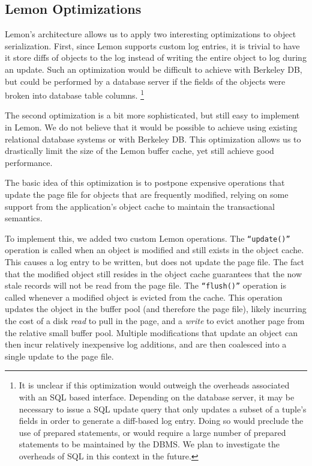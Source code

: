 \documentclass[letterpaper,twocolumn,english]{article}
\newcommand{\yad}{Lemon\xspace}
\begin{document}
\subsection{\yad Optimizations}

\yad's architecture allows us to apply two interesting optimizations
to object serialization.  First, since \yad supports
custom log entries, it is trivial to have it store diffs of objects to
the log instead of writing the entire object to log during an update.
Such an optimization would be difficult to achieve with Berkeley DB,
but could be performed by a database server if the fields of the
objects were broken into database table columns. 
\footnote{It is unclear if
this optimization would outweigh the overheads associated with an SQL
based interface.  Depending on the database server, it may be
necessary to issue a SQL update query that only updates a subset of a
tuple's fields in order to generate a diff-based log entry.  Doing so
would preclude the use of prepared statements, or would require a large
number of prepared statements to be maintained by the DBMS. We plan to
investigate the overheads of SQL in this context in the future.}



The second optimization is a bit more sophisticated, but still easy to
implement in \yad.  We do not believe that it would be possible to
achieve using existing relational database systems or with Berkeley
DB.  This optimization allows us to drastically limit the size of the
\yad buffer cache, yet still achieve good performance.

The basic idea of this optimization is to postpone expensive
operations that update the page file for objects that are frequently
modified, relying on some support from the application's object cache
to maintain the transactional semantics.

To implement this, we added two custom \yad operations. The
{\tt``update()''} operation is called when an object is modified and
still exists in the object cache. This causes a log entry to be
written, but does not update the page file. The fact that the modified
object still resides in the object cache guarantees that the now stale
records will not be read from the page file. The {\tt ``flush()''}
operation is called whenever a modified object is evicted from the
cache. This operation updates the object in the buffer pool (and
therefore the page file), likely incurring the cost of a disk {\em
read} to pull in the page, and a {\em write} to evict another page
from the relative small buffer pool. Multiple modifications that
update an object can then incur relatively inexpensive log additions,
and are then coalesced into a single update to the page file.
\end{document}
